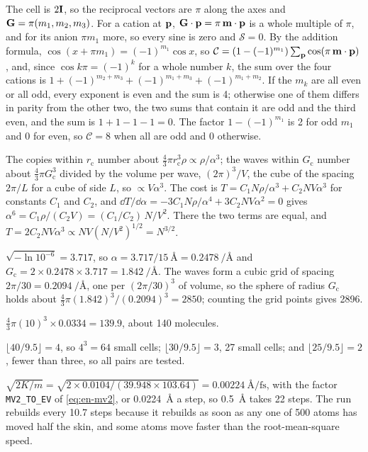 The cell is $2\bm{\mathrm{I}}$, so the reciprocal
vectors are $\pi$ along the axes and $\bm{\mathrm{G}} = \pi(m_1, m_2, m_3)$. For a cation at
$\bm{\mathrm{p}}$, $\bm{\mathrm{G}}\cdot\bm{\mathrm{p}} = \pi\,\bm{\mathrm{m}}\cdot\bm{\mathrm{p}}$ is a whole multiple
of $\pi$, and for its anion $\pi m_1$ more, so every sine is zero and
$\mathcal{S} = 0$. By the addition formula, $\cos(x + \pi m_1) = (-1)^{m_1}\cos x$,
so $\mathcal{C} = (1 - (-1)^{m_1})\sum_{\bm{\mathrm{p}}}\cos(\pi\,\bm{\mathrm{m}}\cdot\bm{\mathrm{p}})$, and,
since $\cos k\pi = (-1)^k$ for a whole number $k$, the sum over the four
cations is $1 + (-1)^{m_2 + m_3} + (-1)^{m_1 + m_3} +
(-1)^{m_1 + m_2}$. If the $m_k$ are all even or all odd, every exponent is
even and the sum is 4; otherwise one of them differs in parity from the
other two, the two sums that contain it are odd and the third even, and
the sum is $1 + 1 - 1 - 1 = 0$. The factor $1 - (-1)^{m_1}$ is 2 for odd
$m_1$ and 0 for even, so $\mathcal{C} = 8$ when all are odd and 0 otherwise.

The copies within $r_{\mathrm c}$ number about
$\frac43\pi r_{\mathrm c}^3\rho \propto \rho/\alpha^3$; the waves within
$G_{\mathrm c}$ number about $\frac43\pi G_{\mathrm c}^3$ divided by the
volume per wave, $(2\pi)^3/V$, the cube of the spacing $2\pi/L$ for a cube
of side $L$, so $\propto V\alpha^3$. The cost is $T = C_1N\rho/\alpha^3 +
C_2NV\alpha^3$ for constants $C_1$ and $C_2$, and $\dd T/\dd\alpha =
-3C_1N\rho/\alpha^4 + 3C_2NV\alpha^2 = 0$ gives $\alpha^6 =
C_1\rho/(C_2V) = (C_1/C_2)\,N/V^2$. There the two terms are equal, and $T
= 2C_2NV\alpha^3 \propto NV(N/V^2)^{1/2} = N^{3/2}$.

$\sqrt{-\ln10^{-6}} = 3.717$, so $\alpha =
3.717/\SI{15}{\angstrom} = \SI{0.2478}{\per\angstrom}$ and $G_{\mathrm c}
= 2\times0.2478\times3.717 = \SI{1.842}{\per\angstrom}$. The waves form a
cubic grid of spacing $2\pi/30 = \SI{0.2094}{\per\angstrom}$, one per
$(2\pi/30)^3$ of volume, so the sphere of radius $G_{\mathrm c}$ holds
about $\frac43\pi(1.842)^3/(0.2094)^3 = 2850$; counting the grid points
gives 2896.

$\frac43\pi(10)^3\times0.0334 = 139.9$, about
140 molecules.

$\lfloor40/9.5\rfloor = 4$, so $4^3 = 64$ small
cells; $\lfloor30/9.5\rfloor = 3$, 27 small cells; and $\lfloor25/9.5
\rfloor = 2$, fewer than three, so all pairs are tested.

$\sqrt{2K/m} = \sqrt{2\times0.0104/(39.948\times
103.64)} = \SI{0.00224}{\angstrom\per\femto\second}$, with the factor
\texttt{MV2\_TO\_EV} of \cref{eq:en-mv2}, or \SI{0.0224}{\angstrom}
a step, so \SI{0.5}{\angstrom} takes 22 steps. The run rebuilds every
10.7 steps because it rebuilds as soon as any one of 500 atoms has moved
half the skin, and some atoms move faster than the root-mean-square speed.


